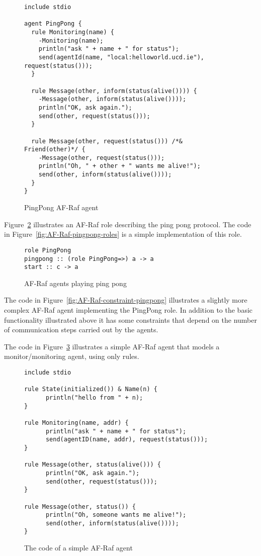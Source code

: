 \documentclass[a4paper,12pt,oneside,fleqn]{book} %
\theoremstyle{plain}
\theoremstyle{definition}
\theoremstyle{remark}
\newcommand{\rg}[1]{\marginpar{\tiny\raggedright\textcolor{blue}{\bf rg:} #1}}
\begin{document}
\begin{figure}\footnotesize %
\begin{verbatim}
include stdio

agent PingPong {
  rule Monitoring(name) {
    -Monitoring(name);
    println("ask " + name + " for status");
    send(agentId(name, "local:helloworld.ucd.ie"), request(status()));
  }
       
  rule Message(other, inform(status(alive()))) {
    -Message(other, inform(status(alive())));
    println("OK, ask again.");
    send(other, request(status())); 
  }
            
  rule Message(other, request(status())) /*& Friend(other)*/ {
    -Message(other, request(status()));
    println("Oh, " + other + " wants me alive!");
    send(other, inform(status(alive())));
  }
}
\end{verbatim}
\caption{PingPong AF-Raf agent}
\label{fig:AF-Raf-pingpong-d}
\end{figure} %


Figure~\ref{fig:AF-Raf-pingpong-role} illustrates an AF-Raf role describing
the ping pong protocol. The code in Figure~\ref{fig:AF-Raf-pingpong-roles}
is a simple implementation of this role.

\begin{figure}\footnotesize %
\begin{verbatim}
role PingPong
pingpong :: (role PingPong=>) a -> a
start :: c -> a
\end{verbatim}
\caption{AF-Raf agents playing ping pong}
\label{fig:AF-Raf-pingpong-role}
\end{figure} %


\rg{It's ${\it value}:{\it type}$, not ${\it type}:{\it value}$.}

The code in Figure~\ref{fig:AF-Raf-constraint-pingpong} illustrates a
slightly more complex AF-Raf agent implementing the PingPong role. In
addition to the basic functionality illustrated above it has some
constraints that depend on the number of communication steps carried out by
the agents.


The code in Figure~\ref{fig:AF-Raf-no-roles} illustrates a simple AF-Raf
agent that models a monitor/monitoring agent, using only rules.

\begin{figure}\footnotesize %
\begin{verbatim}
include stdio

rule State(initialized()) & Name(n) {
      println("hello from " + n);
}

rule Monitoring(name, addr) {
      println("ask " + name + " for status");
      send(agentID(name, addr), request(status()));
}

rule Message(other, status(alive())) {
      println("OK, ask again.");
      send(other, request(status()));
}

rule Message(other, status()) {
      println("Oh, someone wants me alive!");
      send(other, inform(status(alive())));
}
\end{verbatim}
\caption{The code of a simple AF-Raf agent}
\label{fig:AF-Raf-no-roles}
\end{figure} %
\end{document}

